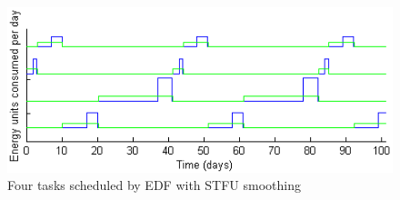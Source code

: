 \begin{figure}[htb]
\includegraphics[scale=0.72]{stfutasks.png}
\caption{Four tasks scheduled by EDF with STFU smoothing}
\label{fig:stfutaskplot}
\end{figure}



































